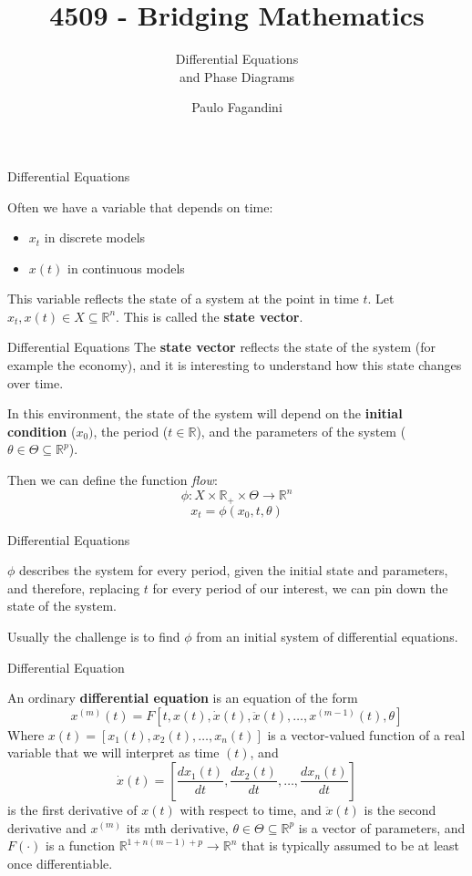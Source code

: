 \documentclass[aspectratio=169, handout]{beamer}
\title[]{4509 - Bridging Mathematics}
\subtitle{Differential Equations\\ and Phase Diagrams}
\author[P. Fagandini]{Paulo Fagandini}
\institute{}
\date{}
\begin{document}
\begin{frame}{Differential Equations}

Often we have a variable that depends on time:

\begin{itemize}
    \item $x_t$ in discrete models
    \item $x(t)$ in continuous models
\end{itemize}

This variable reflects the state of a system at the point in time $t$. Let $x_t,x(t)\in X \subseteq \mathds{R}^n$. This is called the \textbf{state vector}.
    
\end{frame}

\begin{frame}{Differential Equations}
    The \textbf{state vector} reflects the state of the system (for example the economy), and it is interesting to understand how this state changes over time.
    
    In this environment, the state of the system will depend on the \textbf{initial condition} (\(x_0)\), the period (\(t\in\mathds{R}\)), and the parameters of the system (\(\theta\in\Theta\subseteq\mathds{R}^p\)).
    
    Then we can define the function \emph{flow}:
    \[\phi:X\times\mathds{R}_+\times\Theta\rightarrow \mathds{R}^n\] \[x_t=\phi(x_0,t,\theta)\]
\end{frame}

\begin{frame}{Differential Equations}

    $\phi$ describes the system for every period, given the initial state and parameters, and therefore, replacing $t$ for every period of our interest, we can pin down the state of the system.
    
    Usually the challenge is to find $\phi$ from an initial system of differential equations.
    
\end{frame}

\begin{frame}{Differential Equation}
    \begin{definition}
        An ordinary \textbf{differential equation} is an equation of the form \[x^{(m)}(t)=F[t,x(t),\dot{x}(t),\ddot{x}(t),\ldots,x^{(m-1)}(t),\theta]\]
        Where \(x(t)=[x_1(t),x_2(t),\ldots,x_n(t)]\) is a vector-valued function of a real variable that we will interpret as time $(t)$, and
        \[\dot{x}(t)=\left[\frac{d x_1(t)}{dt},\frac{d x_2(t)}{dt},\ldots,\frac{d x_n(t)}{dt}\right]\]
        is the first derivative of $x(t)$ with respect to time, and $\ddot{x}(t)$ is the second derivative and $x^{(m)}$ its mth derivative, \(\theta\in\Theta\subseteq\mathds{R}^p\) is a vector of parameters, and $F(\cdot)$ is a function $\mathds{R}^{1+n(m-1)+p}\rightarrow\mathds{R}^n$ that is typically assumed to be at least once differentiable.
    \end{definition}
\end{frame}
\end{document}
